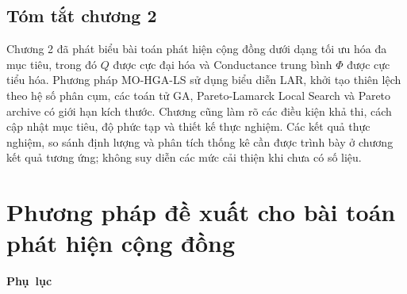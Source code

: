 \documentclass[14pt,a4paper]{extarticle}
\begin{document}
\subsection{Tóm tắt chương 2}
Chương 2 đã phát biểu bài toán phát hiện cộng đồng dưới dạng tối ưu hóa đa mục tiêu, trong đó $Q$ được cực đại hóa và Conductance trung bình $\Phi$ được cực tiểu hóa. Phương pháp MO-HGA-LS sử dụng biểu diễn LAR, khởi tạo thiên lệch theo hệ số phân cụm, các toán tử GA, Pareto-Lamarck Local Search và Pareto archive có giới hạn kích thước. Chương cũng làm rõ các điều kiện khả thi, cách cập nhật mục tiêu, độ phức tạp và thiết kế thực nghiệm. Các kết quả thực nghiệm, so sánh định lượng và phân tích thống kê cần được trình bày ở chương kết quả tương ứng; không suy diễn các mức cải thiện khi chưa có số liệu.

\newpage
\section{Phương pháp đề xuất cho bài toán phát hiện cộng đồng}

\renewcommand{\refname}{\mbox{Danh mục tài liệu tham khảo}}



\mbox{\textbf{\fontsize{14}{21}\selectfont Phụ lục}}


\end{document}
